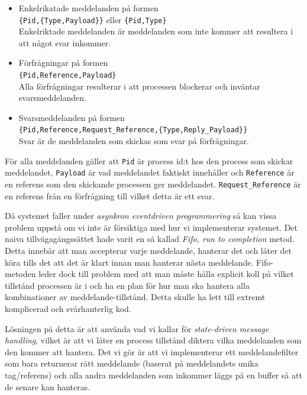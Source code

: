 \documentclass[12pt]{article}
\begin{document}
\begin{itemize}
    \item Enkelrikatade meddelanden på formen \\
    \texttt{\{Pid,\{Type,Payload\}\}} eller \texttt{\{Pid,Type\}} \\
    Enkelriktade meddelanden är meddelanden som inte kommer att resultera i att något svar inkommer.
    \item Förfrågningar på formen \\
    \texttt{\{Pid,Reference,Payload\}} \\
    Alla förfrågningar resulterar i att processen blockerar och inväntar svarsmeddelanden.
    \item Svarsmeddelanden på formen \\
    \texttt{\{Pid,Reference,Request\_Reference,\{Type,Reply\_Payload\}\}} \\
    Svar är de meddelanden som skickas som svar på förfrågningar.
\end{itemize}

För alla meddelanden gäller att \texttt{Pid} är process id:t hos den process som skickar meddelandet,
\texttt{Payload} är vad meddelandet faktiskt innehåller och \texttt{Reference} är en referens som den skickande processen ger meddelandet.
\texttt{Request\_Reference} är en referens från en förfrågning till vilket detta är ett svar.

Då systemet faller under \textit{asynkron eventdriven programmering} så kan vissa problem uppstå om vi inte är försiktiga med hur vi implementerar systemet.
Det naiva tillvägagångssättet hade varit en så kallad \textit{Fifo, run to completion} metod.
Detta innebär att man accepterar varje meddelande, hanterar det och låter det köra tills det att det är klart innan man hanterar nästa meddelande.
Fifo-metoden leder dock till problem med att man måste hålla explicit koll på vilket tillstånd processen är i och ha en plan för hur man ska hantera alla kombinationer av meddelande-tillstånd.
Detta skulle ha lett till extremt komplicerad och svårhanterlig kod.~\cite{wiger-complexity}

Lösningen på detta är att använda vad vi kallar för \textit{state-driven message handling},
vilket är att vi låter en process tillstånd diktera vilka meddelanden som den kommer att hantera.
Det vi gör är att vi implementerar ett meddelandefilter som bara returnerar rätt meddelande (baserat på meddelandets unika tag/referens) och alla andra meddelanden som inkommer läggs på en buffer så att de senare kan hanteras.
\end{document}
